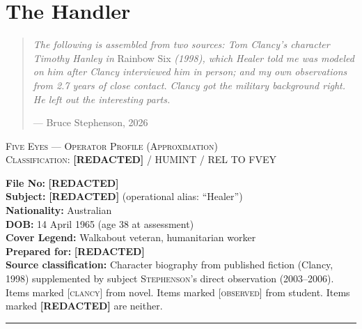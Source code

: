 

\chapter*{The Handler}
\label{interlude:the-handler}

\begin{quote}\small
\textit{The following is assembled from two sources: Tom Clancy's character Timothy Hanley in} Rainbow Six \textit{(1998), which Healer told me was modeled on him after Clancy interviewed him in person; and my own observations from 2.7 years of close contact. Clancy got the military background right. He left out the interesting parts.}
\par\raggedleft --- Bruce Stephenson, 2026\end{quote}

\vspace{1cm}

\begin{center}
\textsc{Five Eyes --- Operator Profile (Approximation)}\\[0.3em]
\textsc{Classification: \textbf{[REDACTED]} / HUMINT / REL TO FVEY}
\end{center}

\vspace{0.5cm}

\noindent\textbf{File No:} \textbf{[REDACTED]}\\
\textbf{Subject:} \textbf{[REDACTED]} (operational alias: ``Healer'')\\
\textbf{Nationality:} Australian\\
\textbf{DOB:} 14 April 1965 (age 38 at assessment)\\
\textbf{Cover Legend:} Walkabout veteran, humanitarian worker\\
\textbf{Prepared for:} \textbf{[REDACTED]}\\
\textbf{Source classification:} Character biography from published fiction (Clancy, 1998) supplemented by subject \textsc{Stephenson}'s direct observation (2003--2006). Items marked \textsc{[clancy]} from novel. Items marked \textsc{[observed]} from student. Items marked \textbf{[REDACTED]} are neither.

\vspace{1cm}\hrule\vspace{1cm}

